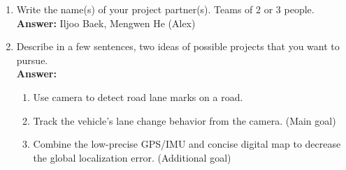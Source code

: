 \documentclass[letterpaper,11pt]{article}
\begin{document}
\begin{enumerate}
	\item Write the name(s) of your project partner(s). Teams of 2 or 3 people.\\
	\textbf{Answer:} Iljoo Baek, Mengwen He (Alex)
	\item Describe in a few sentences, two ideas of possible projects that you want to pursue.\\
	\textbf{Answer:}
	\begin{enumerate}
		\item Use camera to detect road lane marks on a road. 
		\item Track the vehicle's lane change behavior from the camera. (Main goal)
		\item Combine the low-precise GPS/IMU and concise digital map to decrease the global localization error. (Additional goal)
	\end{enumerate}
\end{enumerate}
\end{document}
